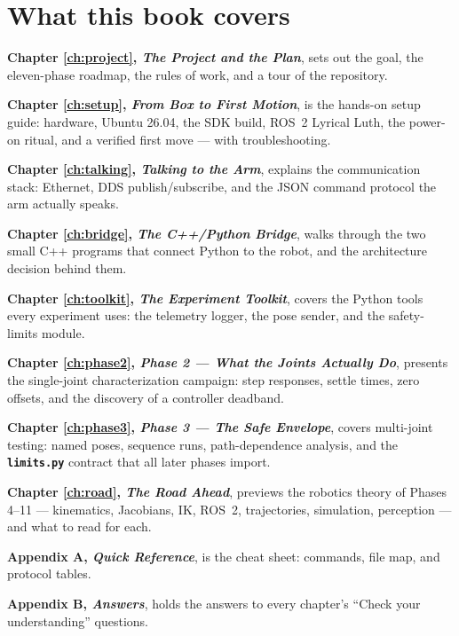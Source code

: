 \documentclass[11pt,twoside,openright]{book}
\newcommand{\code}[1]{\texttt{\bfseries #1}}
\begin{document}
\section*{What this book covers}

\noindent\textbf{Chapter \ref{ch:project}, \textit{The Project and the
Plan}}, sets out the goal, the eleven-phase roadmap, the rules of work,
and a tour of the repository.

\noindent\textbf{Chapter \ref{ch:setup}, \textit{From Box to First
Motion}}, is the hands-on setup guide: hardware, Ubuntu 26.04, the SDK
build, ROS~2 Lyrical Luth, the power-on ritual, and a verified first
move --- with troubleshooting.

\noindent\textbf{Chapter \ref{ch:talking}, \textit{Talking to the Arm}},
explains the communication stack: Ethernet, DDS publish/subscribe, and the
JSON command protocol the arm actually speaks.

\noindent\textbf{Chapter \ref{ch:bridge}, \textit{The C++/Python
Bridge}}, walks through the two small C++ programs that connect Python to
the robot, and the architecture decision behind them.

\noindent\textbf{Chapter \ref{ch:toolkit}, \textit{The Experiment
Toolkit}}, covers the Python tools every experiment uses: the telemetry
logger, the pose sender, and the safety-limits module.

\noindent\textbf{Chapter \ref{ch:phase2}, \textit{Phase 2 --- What the
Joints Actually Do}}, presents the single-joint characterization campaign:
step responses, settle times, zero offsets, and the discovery of a
controller deadband.

\noindent\textbf{Chapter \ref{ch:phase3}, \textit{Phase 3 --- The Safe
Envelope}}, covers multi-joint testing: named poses, sequence runs,
path-dependence analysis, and the \code{limits.py} contract that all later
phases import.

\noindent\textbf{Chapter \ref{ch:road}, \textit{The Road Ahead}}, previews
the robotics theory of Phases 4--11 --- kinematics, Jacobians, IK, ROS~2,
trajectories, simulation, perception --- and what to read for each.

\noindent\textbf{Appendix A, \textit{Quick Reference}}, is the cheat sheet:
commands, file map, and protocol tables.

\noindent\textbf{Appendix B, \textit{Answers}}, holds the answers to every
chapter's ``Check your understanding'' questions.

\newpage
\end{document}
